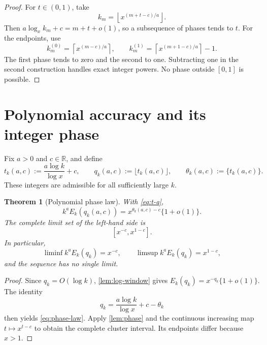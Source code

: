 \documentclass[11pt]{article}
\newtheorem{theorem}{Theorem}[section]
\theoremstyle{remark}
\begin{document}
\begin{proof}
For $t\in(0,1)$, take
\[
 k_m=\left\lfloor x^{(m+t-c)/a}\right\rfloor.
\]
Then $a\log_x k_m+c=m+t+o(1)$, so a subsequence of phases tends to $t$.
For the endpoints, use
\[
 k_m^{(0)}=\left\lceil x^{(m-c)/a}\right\rceil,
 \qquad
 k_m^{(1)}=\left\lceil x^{(m+1-c)/a}\right\rceil-1.
\]
The first phase tends to zero and the second to one.  Subtracting one in the
second construction handles exact integer powers.  No phase outside $[0,1]$
is possible.
\end{proof}

\section{Polynomial accuracy and its integer phase}

Fix $a>0$ and $c\in\mathbb R$, and define
\begin{equation}\label{eq:t-q}
 t_k(a,c):=\frac{a\log k}{\log x}+c,
 \qquad q_k(a,c):=\lfloor t_k(a,c)\rfloor,
 \qquad \theta_k(a,c):=\{t_k(a,c)\}.
\end{equation}
These integers are admissible for all sufficiently large $k$.

\begin{theorem}[Polynomial phase law]\label{thm:phase-law}
With \eqref{eq:t-q},
\begin{equation}\label{eq:phase-law}
 \boxed{
 k^aE_k(q_k(a,c))
 =x^{\theta_k(a,c)-c}\{1+o(1)\}.}
\end{equation}
The complete limit set of the left-hand side is
\begin{equation}\label{eq:error-cluster}
 \boxed{[x^{-c},x^{1-c}].}
\end{equation}
In particular,
\begin{equation}\label{eq:liminf-limsup}
 \liminf k^aE_k(q_k)=x^{-c},
 \qquad
 \limsup k^aE_k(q_k)=x^{1-c},
\end{equation}
and the sequence has no single limit.
\end{theorem}

\begin{proof}
Since $q_k=O(\log k)$, \cref{lem:log-window} gives
$E_k(q_k)=x^{-q_k}\{1+o(1)\}$.  The identity
\[
 q_k=\frac{a\log k}{\log x}+c-\theta_k
\]
then yields \eqref{eq:phase-law}.  Apply \cref{lem:phase} and the continuous
increasing map $t\mapsto x^{t-c}$ to obtain the complete cluster interval.
Its endpoints differ because $x>1$.
\end{proof}
\end{document}
